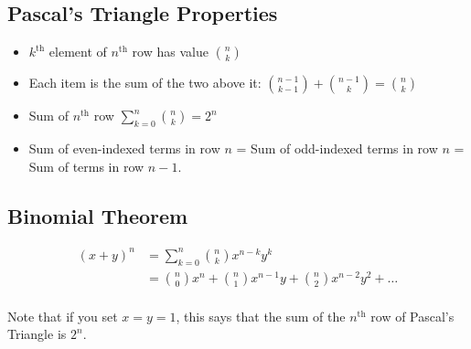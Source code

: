 \documentclass[12pt]{article}
\begin{document}
\subsection*{Pascal's Triangle Properties}
\begin{itemize}
\item $k^{\text{th}}$ element of $n^{\text{th}}$ row has value $\binom{n}{k}$
\item Each item is the sum of the two above it: $\binom{n-1}{k-1} + \binom{n-1}{k} = \binom{n}{k}$
\item Sum of $n^{\text{th}}$ row $\sum_{k=0}^{n}\binom{n}{k}=2^n$
\item Sum of even-indexed terms in row $n$ = Sum of odd-indexed terms in row $n$ = Sum of terms in row $n-1$.
\end{itemize}
\subsection*{Binomial Theorem}
\begin{align*}
    (x+y)^n &= \sum_{k=0}^n \binom{n}{k}x^{n-k}y^k\\
    &= \binom{n}{0}x^n + \binom{n}{1}x^{n-1}y + \binom{n}{2}x^{n-2}y^2 + \ldots\\
\end{align*}

Note that if you set $x=y=1$, this says that the sum of the $n^{\text{th}}$ row  of Pascal's Triangle is $2^n$.
\pagebreak
\end{document}
